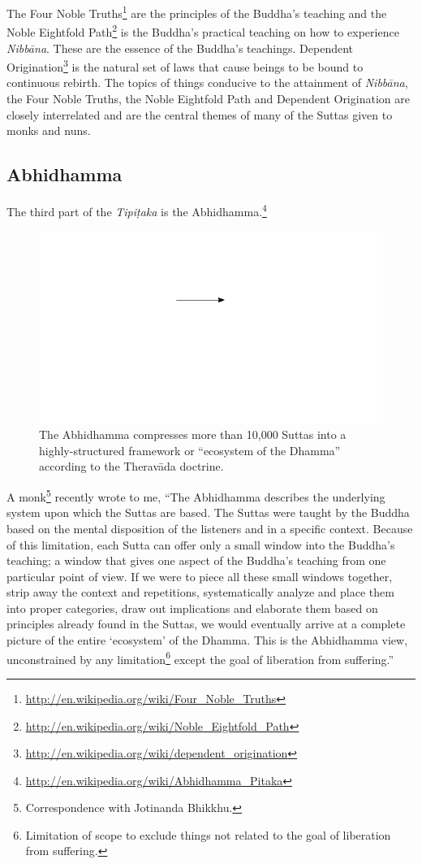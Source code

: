 The Four Noble Truths\footnote{\url{http://en.wikipedia.org/wiki/Four_Noble_Truths}} are the principles of the Buddha’s teaching and the Noble Eightfold Path\footnote{\url{http://en.wikipedia.org/wiki/Noble_Eightfold_Path}} is the Buddha’s practical teaching on how to experience \textit{Nibbāna}. These are the essence of the Buddha’s teachings. Dependent Origination\footnote{\url{http://en.wikipedia.org/wiki/dependent_origination}} is the natural set of laws that cause beings to be bound to continuous rebirth. The topics of things conducive to the attainment of \textit{Nibbāna}, the Four Noble Truths, the Noble Eightfold Path and Dependent Origination are closely interrelated and are the central themes of many of the Suttas given to monks and nuns.

\pagebreak

\subsection*{Abhidhamma}

The third part of the \textit{Tipiṭaka} is the Abhidhamma.\footnote{\url{http://en.wikipedia.org/wiki/Abhidhamma_Pitaka}}

\begin{figure}[H]
\centering
\includegraphics[width=0.25\linewidth]{./Diagrams/Funnel}
\caption{The Abhidhamma compresses more than 10,000 Suttas into a highly-structured framework or “ecosystem of the Dhamma” according to the Theravāda doctrine.}
\label{fig:Funnel}
\end{figure}

A monk\footnote{Correspondence with Jotinanda Bhikkhu.} recently wrote to me, “The Abhidhamma describes the underlying system upon which the Suttas are based. The Suttas were taught by the Buddha based on the mental disposition of the listeners and in a specific context. Because of this limitation, each Sutta can offer only a small window into the Buddha’s teaching; a window that gives one aspect of the Buddha’s teaching from one particular point of view. If we were to piece all these small windows together, strip away the context and repetitions, systematically analyze and place them into proper categories, draw out implications and elaborate them based on principles already found in the Suttas, we would eventually arrive at a complete picture of the entire `ecosystem’ of the Dhamma. This is the Abhidhamma view, unconstrained by any limitation\footnote{Limitation of scope to exclude things not related to the goal of liberation from suffering.} except the goal of liberation from suffering.”

